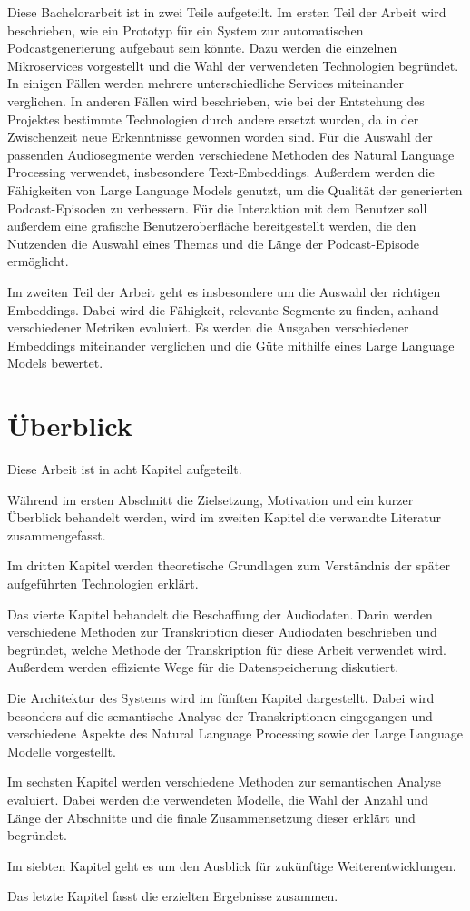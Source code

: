 Diese Bachelorarbeit ist in zwei Teile aufgeteilt.
Im ersten Teil der Arbeit wird beschrieben, wie ein Prototyp für ein System zur automatischen Podcastgenerierung aufgebaut sein könnte.
Dazu werden die einzelnen Mikroservices vorgestellt und die Wahl der verwendeten Technologien begründet.
In einigen Fällen werden mehrere unterschiedliche Services miteinander verglichen.
In anderen Fällen wird beschrieben, wie bei der Entstehung des Projektes bestimmte Technologien durch andere ersetzt wurden, da in der Zwischenzeit neue Erkenntnisse gewonnen worden sind.
Für die Auswahl der passenden Audiosegmente werden verschiedene Methoden des Natural Language Processing verwendet, insbesondere Text-Embeddings.
Außerdem werden die Fähigkeiten von Large Language Models genutzt, um die Qualität der generierten Podcast-Episoden zu verbessern.
Für die Interaktion mit dem Benutzer soll außerdem eine grafische Benutzeroberfläche bereitgestellt werden, die den Nutzenden die Auswahl eines Themas und die Länge der Podcast-Episode ermöglicht.

Im zweiten Teil der Arbeit geht es insbesondere um die Auswahl der richtigen Embeddings.
Dabei wird die Fähigkeit, relevante Segmente zu finden, anhand verschiedener Metriken evaluiert.
Es werden die Ausgaben verschiedener Embeddings miteinander verglichen und die Güte mithilfe eines Large Language Models bewertet.

\section{Überblick}

Diese Arbeit ist in acht Kapitel aufgeteilt.

Während im ersten Abschnitt die Zielsetzung, Motivation und ein kurzer Überblick behandelt werden, wird im zweiten Kapitel die verwandte Literatur zusammengefasst.

Im dritten Kapitel werden theoretische Grundlagen zum Verständnis der später aufgeführten Technologien erklärt.

Das vierte Kapitel behandelt die Beschaffung der Audiodaten.
Darin werden verschiedene Methoden zur Transkription dieser Audiodaten beschrieben und begründet, welche Methode der Transkription für diese Arbeit verwendet wird.
Außerdem werden effiziente Wege für die Datenspeicherung diskutiert.

Die Architektur des Systems wird im fünften Kapitel dargestellt.
Dabei wird besonders auf die semantische Analyse der Transkriptionen eingegangen und verschiedene Aspekte des Natural Language Processing sowie der Large Language Modelle vorgestellt.

Im sechsten Kapitel werden verschiedene Methoden zur semantischen Analyse evaluiert.
Dabei werden die verwendeten Modelle, die Wahl der Anzahl und Länge der Abschnitte und die finale Zusammensetzung dieser erklärt und begründet.

Im siebten Kapitel geht es um den Ausblick für zukünftige Weiterentwicklungen.

Das letzte Kapitel fasst die erzielten Ergebnisse zusammen.
